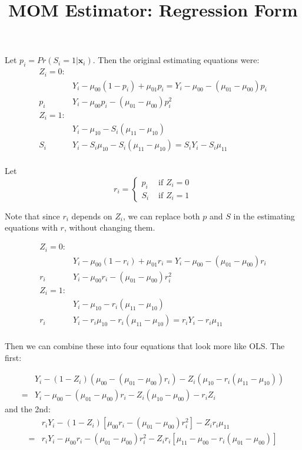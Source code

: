 \documentclass[11pt]{article} %
\title{MOM Estimator: Regression Form}
\begin{document}
\maketitle

Let $p_i=Pr(S_i=1|\bm{x}_i)$.
Then the original estimating equations were:
\begin{align*}
  Z_i=0:&\\
  &Y_i-\mu_{00}(1-p_i)+\mu_{01}p_i=Y_i-\mu_{00}-(\mu_{01}-\mu_{00})p_i\\
  p_i&Y_i-\mu_{00}p_i-(\mu_{01}-\mu_{00})p_i^2\\
  Z_i=1:&\\
        &Y_i-\mu_{10}-S_i(\mu_{11}-\mu_{10})\\
  S_i&Y_i-S_i\mu_{10}-S_i(\mu_{11}-\mu_{10})=S_iY_i-S_i\mu_{11}\\
\end{align*}

Let
\begin{equation}
  r_i=
  \begin{cases}
    p_i&\text{ if }Z_i=0\\
    S_i&\text{ if }Z_i=1
  \end{cases}
\end{equation}

Note that since $r_i$ depends on $Z_i$, we can replace both $p$ and $S$ in the estimating equations with $r$, without changing them.

\begin{align*}
  Z_i=0:&\\
  &Y_i-\mu_{00}(1-r_i)+\mu_{01}r_i=Y_i-\mu_{00}-(\mu_{01}-\mu_{00})r_i\\
  r_i&Y_i-\mu_{00}r_i-(\mu_{01}-\mu_{00})r_i^2\\
  Z_i=1:&\\
        &Y_i-\mu_{10}-r_i(\mu_{11}-\mu_{10})\\
  r_i&Y_i-r_i\mu_{10}-r_i(\mu_{11}-\mu_{10})=r_iY_i-r_i\mu_{11}\\
\end{align*}

Then we can combine these into four equations that look more like OLS. The first:

\begin{align*}
  &Y_i-(1-Z_i)(\mu_{00}-(\mu_{01}-\mu_{00})r_i)-Z_i(\mu_{10}-r_i(\mu_{11}-\mu_{10}))\\
  =& Y_i-\mu_{00}-(\mu_{01}-\mu_{00})r_i-Z_i(\mu_{10}-\mu_{00})-r_iZ_i
\end{align*}
and the 2nd:
\begin{align*}
  &r_iY_i-(1-Z_i)\left[\mu_{00}r_i-(\mu_{01}-\mu_{00})r_i^2\right]-Z_ir_i\mu_{11}\\
  =&r_iY_i-\mu_{00}r_i-(\mu_{01}-\mu_{00})r_i^2-Z_ir_i\left[\mu_{11}-\mu_{00}-r_i(\mu_{01}-\mu_{00})\right]\\
\end{align*}
\end{document}
